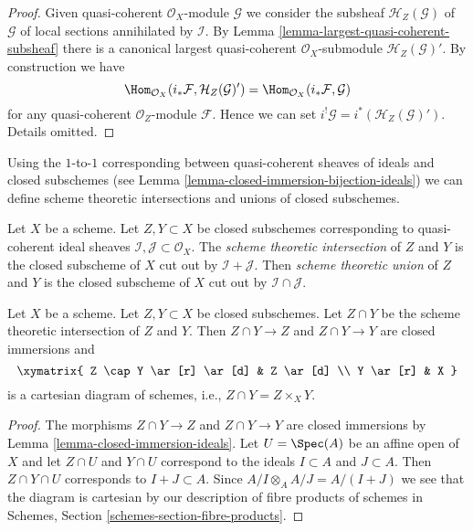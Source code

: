 \begin{proof}
Given quasi-coherent $\mathcal{O}_X$-module $\mathcal{G}$ we consider
the subsheaf $\mathcal{H}_Z(\mathcal{G})$ of $\mathcal{G}$ of local sections
annihilated by $\mathcal{I}$. By
Lemma \ref{lemma-largest-quasi-coherent-subsheaf}
there is a canonical largest quasi-coherent $\mathcal{O}_X$-submodule
$\mathcal{H}_Z(\mathcal{G})'$. By construction we have
$$
\Hom_{\mathcal{O}_X}(i_*\mathcal{F}, \mathcal{H}_Z(\mathcal{G})')
=
\Hom_{\mathcal{O}_X}(i_*\mathcal{F}, \mathcal{G})
$$
for any quasi-coherent $\mathcal{O}_Z$-module $\mathcal{F}$.
Hence we can set $i^!\mathcal{G} = i^*(\mathcal{H}_Z(\mathcal{G})')$.
Details omitted.
\end{proof}

\noindent
Using the $1$-to-$1$ corresponding between quasi-coherent sheaves
of ideals and closed subschemes (see
Lemma \ref{lemma-closed-immersion-bijection-ideals})
we can define scheme theoretic intersections and unions
of closed subschemes.

\begin{definition}
\label{definition-scheme-theoretic-intersection-union}
Let $X$ be a scheme. Let $Z, Y \subset X$ be closed subschemes
corresponding to quasi-coherent ideal sheaves
$\mathcal{I}, \mathcal{J} \subset \mathcal{O}_X$.
The {\it scheme theoretic intersection} of $Z$ and $Y$
is the closed subscheme of $X$ cut out by $\mathcal{I} + \mathcal{J}$.
Then {\it scheme theoretic union} of $Z$ and $Y$
is the closed subscheme of $X$ cut out by
$\mathcal{I} \cap \mathcal{J}$.
\end{definition}

\begin{lemma}
\label{lemma-scheme-theoretic-intersection}
Let $X$ be a scheme. Let $Z, Y \subset X$ be closed subschemes.
Let $Z \cap Y$ be the scheme theoretic intersection of $Z$ and $Y$.
Then $Z \cap Y \to Z$ and $Z \cap Y \to Y$ are closed immersions
and
$$
\xymatrix{
Z \cap Y \ar[r] \ar[d] & Z \ar[d] \\
Y \ar[r] & X
}
$$
is a cartesian diagram of schemes, i.e., $Z \cap Y = Z \times_X Y$.
\end{lemma}

\begin{proof}
The morphisms $Z \cap Y \to Z$ and $Z \cap Y \to Y$ are closed immersions
by Lemma \ref{lemma-closed-immersion-ideals}.
Let $U = \Spec(A)$ be an affine open of $X$ and let $Z \cap U$ and $Y \cap U$
correspond to the ideals $I \subset A$ and $J \subset A$. Then
$Z \cap Y \cap U$ corresponds to $I + J \subset A$. Since
$A/I \otimes_A A/J = A/(I + J)$ we see that the diagram is
cartesian by our description of fibre products of schemes
in Schemes, Section \ref{schemes-section-fibre-products}.
\end{proof}

